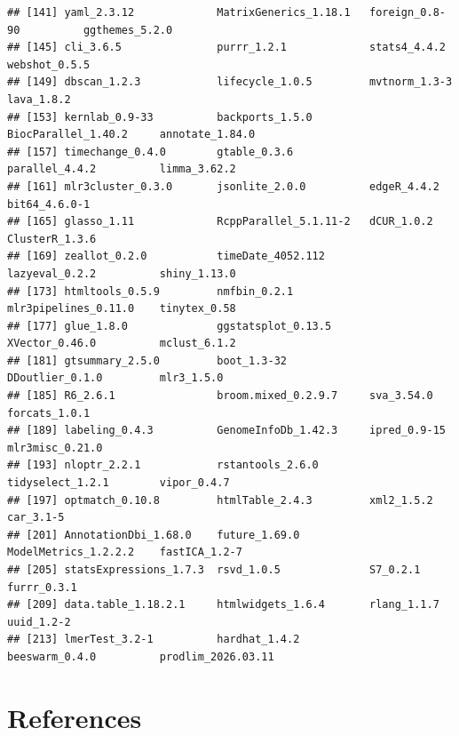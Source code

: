 \documentclass[
]{article}
\begin{document}
\begin{verbatim}
## [141] yaml_2.3.12             MatrixGenerics_1.18.1   foreign_0.8-90          ggthemes_5.2.0         
## [145] cli_3.6.5               purrr_1.2.1             stats4_4.4.2            webshot_0.5.5          
## [149] dbscan_1.2.3            lifecycle_1.0.5         mvtnorm_1.3-3           lava_1.8.2             
## [153] kernlab_0.9-33          backports_1.5.0         BiocParallel_1.40.2     annotate_1.84.0        
## [157] timechange_0.4.0        gtable_0.3.6            parallel_4.4.2          limma_3.62.2           
## [161] mlr3cluster_0.3.0       jsonlite_2.0.0          edgeR_4.4.2             bit64_4.6.0-1          
## [165] glasso_1.11             RcppParallel_5.1.11-2   dCUR_1.0.2              ClusterR_1.3.6         
## [169] zeallot_0.2.0           timeDate_4052.112       lazyeval_0.2.2          shiny_1.13.0           
## [173] htmltools_0.5.9         nmfbin_0.2.1            mlr3pipelines_0.11.0    tinytex_0.58           
## [177] glue_1.8.0              ggstatsplot_0.13.5      XVector_0.46.0          mclust_6.1.2           
## [181] gtsummary_2.5.0         boot_1.3-32             DDoutlier_0.1.0         mlr3_1.5.0             
## [185] R6_2.6.1                broom.mixed_0.2.9.7     sva_3.54.0              forcats_1.0.1          
## [189] labeling_0.4.3          GenomeInfoDb_1.42.3     ipred_0.9-15            mlr3misc_0.21.0        
## [193] nloptr_2.2.1            rstantools_2.6.0        tidyselect_1.2.1        vipor_0.4.7            
## [197] optmatch_0.10.8         htmlTable_2.4.3         xml2_1.5.2              car_3.1-5              
## [201] AnnotationDbi_1.68.0    future_1.69.0           ModelMetrics_1.2.2.2    fastICA_1.2-7          
## [205] statsExpressions_1.7.3  rsvd_1.0.5              S7_0.2.1                furrr_0.3.1            
## [209] data.table_1.18.2.1     htmlwidgets_1.6.4       rlang_1.1.7             uuid_1.2-2             
## [213] lmerTest_3.2-1          hardhat_1.4.2           beeswarm_0.4.0          prodlim_2026.03.11
\end{verbatim}

\section*{References}\label{references}
\end{document}
